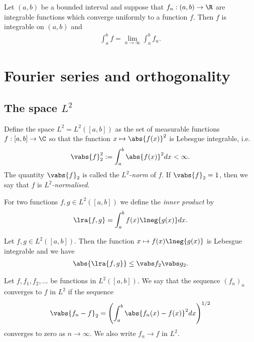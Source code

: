 \documentclass{article}
\begin{document}
\begin{theorem}[Notes 4.13]
    Let $(a,b)$ be a bounded interval and suppose that $f_n:(a,b)\to\R$ are integrable functions 
    which converge uniformly to a function $f$. Then $f$ is integrable on $(a,b)$ and 
    \begin{align*}
        \int_a^b f = \lim_{n\to\infty} \int_a^b f_n.
    \end{align*}
\end{theorem}

\section{Fourier series and orthogonality}

\subsection{The space $L^2$}

\begin{definition}[Notes 5.1]
    Define the space $L^2=L^2([a,b])$ as the set of measurable functions $f:[a,b]\to\C$
    so that the function $x\mapsto \abs{f(x)}^2$ is Lebesgue integrable, i.e. 
    \begin{align*}
       \vabs{f}_2^2 := \int_a^b \abs{f(x)}^2 dx < \infty.
    \end{align*}
    The quantity $\vabs{f}_2$ is called the \emph{$L^2$-norm} of $f$. If $\vabs{f}_2=1$,
    then we say that $f$ is \emph{$L^2$-normalised}.
\end{definition}

\begin{definition}[Notes 5.2]
    For two functions $f,g\in L^2([a,b])$ we define the \emph{inner product} by 
    \begin{align*}
        \lra{f,g} = \int_a^b f(x)\lneg{g(x)}dx.
    \end{align*}
\end{definition}

\begin{theorem}
    Let $f,g\in L^2([a,b])$. Then the function $x\mapsto f(x)\lneg{g(x)}$ is Lebesgue
    integrable and we have
    \begin{align*}
        \abs{\lra{f,g}}\leq \vabs f_2\vabs g_2.
    \end{align*} 
\end{theorem}

\begin{definition}[Notes 5.3]
    Let $f,f_1,f_2,...$ be functions in $L^2([a,b])$. We say that the sequence $(f_n)_n$ converges 
    to $f$ in $L^2$ if the sequence 
    \begin{align*}
        \vabs{f_n - f}_2 = \left(\int_a^b \abs{f_n(x)-f(x)}^2dx\right)^{1/2}
    \end{align*}
    converges to zero as $n\to\infty$. We also write $f_n\to f$ in $L^2$.
\end{definition}
\end{document}
